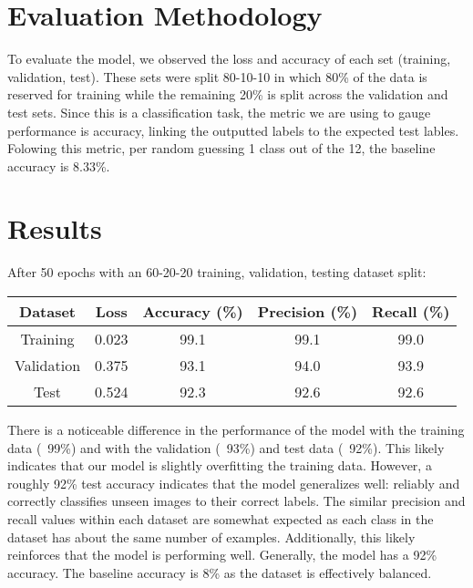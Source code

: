 \documentclass[10pt]{article}
\begin{document}
\section{Evaluation Methodology}

\indent To evaluate the model, we observed the loss and accuracy of each set (training, validation, test). These sets were split 80-10-10 in which 80\% of the data is reserved for training while the remaining 20\% is split across the validation and test sets. Since this is a classification task, the metric we are using to gauge performance is accuracy, linking the outputted labels to the expected test lables. Folowing this metric, per random guessing 1 class out of the 12, the baseline accuracy is 8.33\%.




\section{Results}

\indent After 50 epochs with an 60-20-20 training, validation, testing dataset split:
 
\begin{center}
\begin{tabular}{|c c c c c|} 
 \hline
 Dataset & Loss & Accuracy (\%) & Precision (\%) & Recall (\%) \\ 
 \hline
 Training & 0.023 & 99.1 & 99.1 & 99.0 \\ 
 \hline
 Validation & 0.375 & 93.1 & 94.0 & 93.9 \\ 
 \hline
 Test & 0.524 & 92.3 & 92.6 & 92.6 \\ 
\hline
\end{tabular}
\end{center}

\indent There is a noticeable difference in the performance of the model with the training data (~99\%) and with the validation (~93\%) and test data (~92\%). This likely indicates that our model is slightly overfitting the training data. However, a roughly 92\% test accuracy indicates that the model generalizes well: reliably and correctly classifies unseen images to their correct labels. The similar precision and recall values within each dataset are somewhat expected as each class in the dataset has about the same number of examples. Additionally, this likely reinforces that the model is performing well. Generally, the model has a 92\% accuracy. The baseline accuracy is 8\% as the dataset is effectively balanced.
\end{document}
